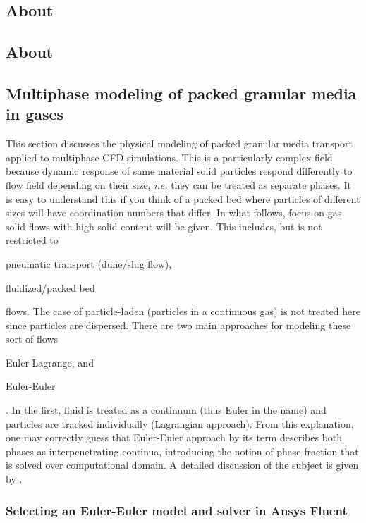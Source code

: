\subsection{About \textcite{Ergun1952}}


\subsection{About \textcite{Gunn1978}} 


\subsection{Multiphase modeling of packed granular media in gases}

This section discusses the physical modeling of packed granular media transport applied to multiphase CFD simulations. This is a particularly complex field because dynamic response of same material solid particles respond differently to flow field depending on their size, \emph{i.e.} they can be treated as separate phases. It is easy to understand this if you think of a packed bed where particles of different sizes will have coordination numbers that differ. In what follows, focus on gas-solid flows with high solid content will be given. This includes, but is not restricted to \begin{inparaenum}[(i)] \item pneumatic transport (dune/slug flow), \item fluidized/packed bed \end{inparaenum} flows. The case of particle-laden (particles in a continuous gas) is not treated here since particles are dispersed. There are two main approaches for modeling these sort of flows \begin{inparaenum}[(i)] \item Euler-Lagrange, and \item Euler-Euler\end{inparaenum}. In the first, fluid is treated as a continuum (thus Euler in the name) and particles are tracked individually (Lagrangian approach). From this explanation, one may correctly guess that Euler-Euler approach by its term describes both phases as interpenetrating continua, introducing the notion of phase fraction that is solved over computational domain. A detailed discussion of the subject is given by \textcite{Crowe2011}.

\subsubsection{Selecting an Euler-Euler model and solver in Ansys Fluent}

